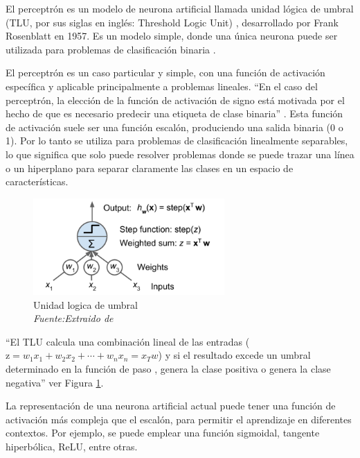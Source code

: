 El perceptrón es un modelo de neurona artificial llamada unidad lógica de umbral (TLU, por sus siglas en inglés: Threshold Logic Unit) , desarrollado por Frank Rosenblatt en 1957. Es un modelo simple, donde una única neurona puede ser utilizada para problemas de clasificación binaria \cite{rosenblatt1957perceptron}.

El perceptrón es un caso particular y simple, con una función de activación específica y aplicable principalmente a problemas lineales. “En el caso del perceptrón, la elección de la función de activación de signo está motivada por el hecho de que es necesario predecir una etiqueta de clase binaria” \cite[p. 11]{aggarwal2018neural}. Esta función de activación suele ser una función escalón, produciendo una salida binaria (0 o 1).  Por lo tanto se utiliza para problemas de clasificación linealmente separables, lo que significa que solo puede resolver problemas donde se puede trazar una línea o un hiperplano para separar claramente las clases en un espacio de características.

\begin{figure}
	
	\includegraphics[width=0.65\textwidth]{capitulo2/figuras/an4.png}
	\caption{Unidad logica de umbral \\ \textit{Fuente:Extraido de \protect\cite[p. 282]{geron2019hands}}}
	\label{fig:an4}
\end{figure}

``El TLU calcula una combinación lineal de las entradas ( $\text{z} = w_1x_1 + w_2x_2 + \cdots + w_nx_n = x_Tw$) y si el resultado excede un umbral determinado en la función de paso , genera la clase positiva o genera la clase negativa''\cite[p. 282]{geron2019hands} ver Figura \ref{fig:an4}. 

La representación de una neurona artificial actual puede tener una función de activación más compleja que el escalón,  para permitir el aprendizaje en diferentes contextos. Por ejemplo, se puede emplear una función sigmoidal, tangente hiperbólica, ReLU, entre otras.







